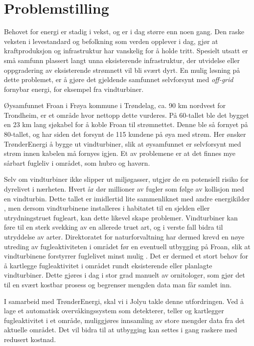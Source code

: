 \section{Problemstilling}
\label{sec:problemstilling}


Behovet for energi er stadig i vekst, og er i dag større enn noen gang. 
Den raske veksten i levestandard og befolkning som verden opplever i dag, gjør at kraftproduksjon og infrastruktur har vanskelig for å holde tritt. 
Spesielt utsatt er små samfunn plassert langt unna eksisterende infrastruktur, der utvidelse eller oppgradering av eksisterende strømnett vil bli svært dyrt. 
En mulig løsning på dette problemet, er å gjøre det gjeldende samfunnet selvforsynt med \textit{off-grid} fornybar energi, for eksempel fra vindturbiner. 

Øysamfunnet Froan i Frøya kommune i Trøndelag, ca. 90 km nordvest for Trondheim, er et område hvor nettopp dette vurderes\cite{AvisFroanVind}. 
På 60-tallet ble det bygget en 23 km lang sjøkabel for å koble Froan til strømnettet. 
Denne ble så fornyet på 80-tallet, og har siden det forsynt de 115 kundene på øya med strøm. 
Her ønsker TrønderEnergi å bygge ut vindturbiner, slik at øysamfunnet er selvforsynt med strøm innen kabelen må fornyes igjen. 
Et av problemene er at det finnes mye sårbart fugleliv i området, som hubro og havørn\cite{froandn}.

Selv om vindturbiner ikke slipper ut miljøgasser, utgjør de en potensiell risiko for dyrelivet i nærheten. 
Hvert år dør millioner av fugler som følge av kollisjon med en vindturbin\cite{dodfugler}. 
Dette tallet er imidlertid lite sammenliknet med andre energikilder \cite{dodfugler}, men dersom vindturbinene installeres i habitatet til en sjelden eller utrydningstruet fugleart, kan dette likevel skape problemer.
Vindturbiner kan føre til en sterk svekking av en allerede truet art, og i verste fall bidra til utryddelse av arter. 
Direktoratet for naturforvaltning har dermed krevd en nøye utreding av fugleaktiviteten i området før en eventuell utbygging på Froan, slik at vindturbinene forstyrrer fuglelivet minst mulig \cite{froandn}. 
Det er dermed et stort behov for å kartlegge fugleaktivitet i området rundt eksisterende eller planlagte vindturbiner.
Dette gjøres i dag i stor grad manuelt av ornitologer, som gjør det til en svært kostbar prosess og begrenser mengden data man får samlet inn.

I samarbeid med TrønderEnergi, skal vi i Jolyu takle denne utfordringen. 
Ved å lage et automatisk overvåkingssystem som detekterer, teller og kartlegger fugleaktivitet i et område, muliggjøres innsamling av store mengder data fra det aktuelle området. 
Det vil bidra til at utbygging kan settes i gang raskere med redusert kostnad.